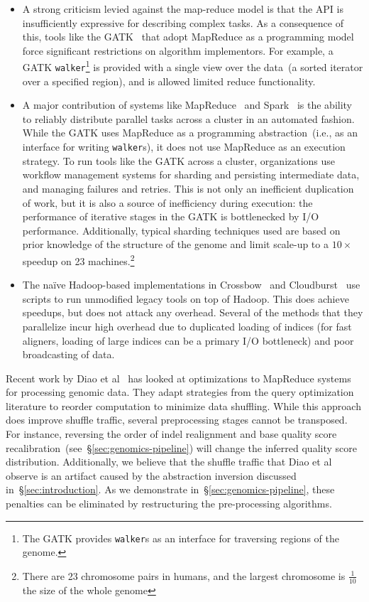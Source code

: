 \documentclass{acm_proc_article-sp}
\begin{document}
\begin{itemize}
\item A strong criticism levied against the map-reduce model is that the API is insufficiently expressive
for describing complex tasks. As a consequence of this, tools like the GATK~\cite{mckenna10} that
adopt MapReduce as a programming model force significant restrictions on algorithm implementors. For
example, a GATK \texttt{walker}\footnote{The GATK provides \texttt{walker}s as an interface for
traversing regions of the genome.} is provided with a single view over the data~(a sorted iterator over a
specified region), and is allowed limited reduce functionality.
\item A major contribution of systems like MapReduce~\cite{dean08} and Spark~\cite{zaharia10,
zaharia12} is the ability to reliably distribute parallel tasks across a cluster in an automated fashion. While
the GATK uses MapReduce as a programming abstraction~(i.e., as an interface for writing
\texttt{walker}s), it does not use MapReduce as an execution strategy. To run tools like the GATK across
a cluster, organizations use workflow management systems for sharding and persisting intermediate
data, and managing failures and retries. This is not only an inefficient duplication of work, but it is also a
source of inefficiency during execution: the performance of iterative stages in the GATK is bottlenecked
by I/O performance. Additionally, typical sharding techniques used are based on prior knowledge of the
structure of the genome and limit scale-up to a $10\times$ speedup on 23 machines.\footnote{There are
23 chromosome pairs in humans, and the largest chromosome is $\frac{1}{10}$ the size of the whole
genome}
\item The na\"{i}ve Hadoop-based implementations in Crossbow~\cite{langmead09} and
Cloudburst~\cite{schatz09} use scripts to run unmodified legacy tools on top of Hadoop. This does
achieve speedups, but does not attack any overhead. Several of the methods that they parallelize incur
high overhead due to duplicated loading of indices (for fast aligners, loading of large indices can be a
primary I/O bottleneck) and poor broadcasting of data.
\end{itemize}

Recent work by Diao et al~\cite{diao15} has looked at optimizations to MapReduce systems for
processing genomic data. They adapt strategies from the query optimization literature to reorder
computation to minimize data shuffling. While this approach does improve shuffle traffic, several
preprocessing stages cannot be transposed. For instance, reversing the order of indel realignment and
base quality score recalibration~(see~\S\ref{sec:genomics-pipeline}) will change the inferred quality
score distribution. Additionally, we believe that the shuffle traffic that Diao et al observe is an artifact
caused by the abstraction inversion discussed in~\S\ref{sec:introduction}. As we demonstrate
in~\S\ref{sec:genomics-pipeline}, these penalties can be eliminated by restructuring the pre-processing
algorithms.
\end{document}
